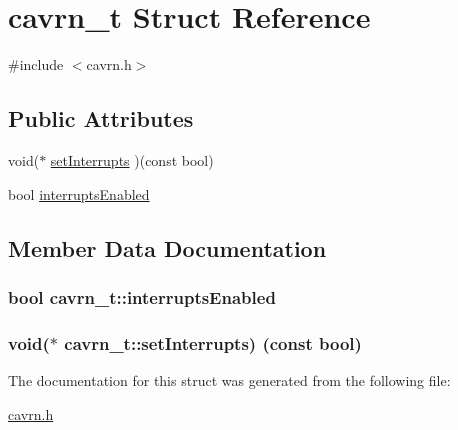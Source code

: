 \hypertarget{structcavrn__t}{}\section{cavrn\+\_\+t Struct Reference}
\label{structcavrn__t}


{\ttfamily \#include $<$cavrn.\+h$>$}

\subsection*{Public Attributes}
\begin{DoxyCompactItemize}
\item 
void($\ast$ \hyperlink{structcavrn__t_a5dd09c6cae4cb58946314e7c19279739}{set\+Interrupts} )(const bool)
\item 
bool \hyperlink{structcavrn__t_afe63f8114e4661a212dda80f63c4ad23}{interrupts\+Enabled}
\end{DoxyCompactItemize}


\subsection{Member Data Documentation}
\hypertarget{structcavrn__t_afe63f8114e4661a212dda80f63c4ad23}{}
\subsubsection[{interrupts\+Enabled}]{\setlength{\rightskip}{0pt plus 5cm}bool cavrn\+\_\+t\+::interrupts\+Enabled}\label{structcavrn__t_afe63f8114e4661a212dda80f63c4ad23}
\hypertarget{structcavrn__t_a5dd09c6cae4cb58946314e7c19279739}{}
\subsubsection[{set\+Interrupts}]{\setlength{\rightskip}{0pt plus 5cm}void($\ast$ cavrn\+\_\+t\+::set\+Interrupts) (const bool)}\label{structcavrn__t_a5dd09c6cae4cb58946314e7c19279739}


The documentation for this struct was generated from the following file\+:\begin{DoxyCompactItemize}
\item 
\hyperlink{cavrn_8h}{cavrn.\+h}\end{DoxyCompactItemize}
